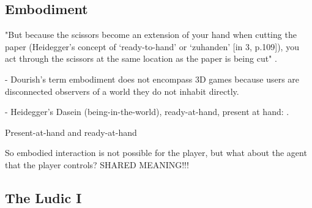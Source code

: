 \subsection{Embodiment}
"But because the scissors become an extension of your hand when cutting the paper (Heidegger’s concept of ‘ready-to-hand’ or ‘zuhanden’ [in 3, p.109]), you act through the scissors at the same location as the paper is being cut" \cite[p. 2]{frogger}.

- Dourish's term embodiment does not encompass 3D games because users are disconnected observers of a world they do not inhabit directly.

- Heidegger's Dasein (being-in-the-world), ready-at-hand, present at hand: .

Present-at-hand and ready-at-hand

So embodied interaction is not possible for the player, but what about the agent that the player controls? SHARED MEANING!!!

\subsection{The Ludic I}
